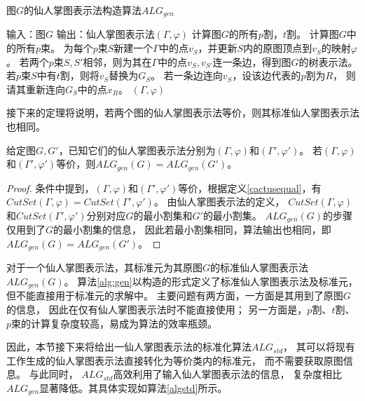 \begin{algorithm}
  \caption{图$G$的仙人掌图表示法构造算法$ALG_{gen}$}
  \label{alg:gen}
  \begin{algorithmic}[1] %
  \Statex 输入：图$G$
  \Statex 输出：仙人掌图表示法$(\Gamma,\varphi)$
  \State 计算图$G$的所有$p$割，$t$割。
  \State 计算图$G$中的所有$p$束。
  \State 为每个$p$束$S$新建一个$\Gamma$中的点$v_S$，并更新$S$内的原图顶点到$v_S$的映射$\varphi$。
  \State 若两个$p$束$S,S'$相邻，则为其在$\Gamma$中的点$v_S,v_{S'}$连一条边，得到图$G$的树表示法。
  \State 若$p$束$S$中有$t$割，则将$v_S$替换为$G_S$。
  若一条边连向$v_S$，设该边代表的$p$割为$R$，
  则请其重新连向$G_S$中的点$x_R$。
  \State \Return $(\Gamma,\varphi)$
  \end{algorithmic}
\end{algorithm}

接下来的定理将说明，若两个图的仙人掌图表示法等价，则其标准仙人掌图表示法也相同。

\begin{theorem}
  给定图$G,G'$，已知它们的仙人掌图表示法分别为$(\Gamma,\varphi)$和$(\Gamma',\varphi')$。
  若$(\Gamma,\varphi)$和$(\Gamma',\varphi')$等价，则$ALG_{gen}(G)=ALG_{gen}(G')$。
\end{theorem}

\begin{proof}
  条件中提到，$(\Gamma,\varphi)$和$(\Gamma',\varphi')$等价，根据定义\ref{cactusequal}，有 $CutSet(\Gamma,\varphi)=CutSet(\Gamma',\varphi')$。
  由仙人掌图表示法的定义，
  $CutSet(\Gamma,\varphi)$和$CutSet(\Gamma',\varphi')$分别对应$G$的最小割集和$G'$的最小割集。
  $ALG_{gen}(G)$的步骤仅用到了$G$的最小割集的信息，
  因此若最小割集相同，算法输出也相同，即$ALG_{gen}(G)=ALG_{gen}(G')$。
\end{proof}

对于一个仙人掌图表示法，其标准元为其原图$G$的标准仙人掌图表示法$ALG_{gen}(G)$。
算法\ref{alg:gen}以构造的形式定义了标准仙人掌图表示法及标准元，
但不能直接用于标准元的求解中。
主要问题有两方面，一方面是其用到了原图$G$的信息，
因此在仅有仙人掌图表示法时不能直接使用；
另一方面是，$p$割、$t$割、$p$束的计算复杂度较高，易成为算法的效率瓶颈。

因此，本节接下来将给出一仙人掌图表示法的标准化算法$ALG_{std}$，
其可以将现有工作生成的仙人掌图表示法直接转化为等价类内的标准元，
而不需要获取原图信息。
与此同时，
$ALG_{std}$高效利用了输入仙人掌图表示法的信息，
复杂度相比$ALG_{gen}$显著降低。其具体实现如算法\ref{algstd}所示。



